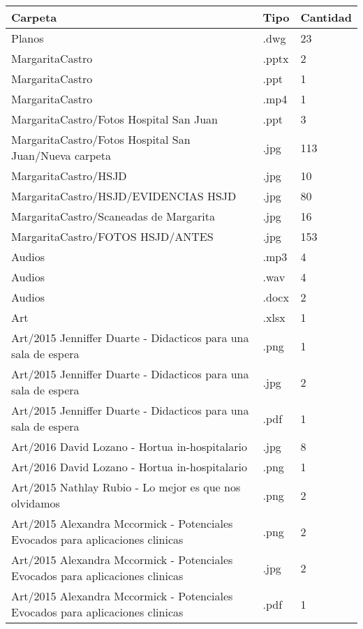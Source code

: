 \begin{table}[h!]
    \centering
    \footnotesize
    \begin{tabular}{|l|l|l|}
    \hline
    Carpeta & Tipo & Cantidad \\
    \hline
    Planos & .dwg & 23 \\
    \hline
    MargaritaCastro & .pptx & 2 \\
    \hline
    MargaritaCastro & .ppt & 1 \\
    \hline
    MargaritaCastro & .mp4 & 1 \\
    \hline
    MargaritaCastro/Fotos Hospital San Juan & .ppt & 3 \\
    \hline
    MargaritaCastro/Fotos Hospital San Juan/Nueva carpeta & .jpg & 113 \\
    \hline
    MargaritaCastro/HSJD & .jpg & 10 \\
    \hline
    MargaritaCastro/HSJD/EVIDENCIAS HSJD & .jpg & 80 \\
    \hline
    MargaritaCastro/Scaneadas de Margarita & .jpg & 16 \\
    \hline
    MargaritaCastro/FOTOS HSJD/ANTES & .jpg & 153 \\
    \hline
    Audios & .mp3 & 4 \\
    \hline
    Audios & .wav & 4 \\
    \hline
    Audios & .docx & 2 \\
    \hline
    Art & .xlsx & 1 \\
    \hline
    Art/2015 Jenniffer Duarte - Didacticos para una sala de espera & .png & 1 \\
    \hline
    Art/2015 Jenniffer Duarte - Didacticos para una sala de espera & .jpg & 2 \\
    \hline
    Art/2015 Jenniffer Duarte - Didacticos para una sala de espera & .pdf & 1 \\
    \hline
    Art/2016 David Lozano - Hortua in-hospitalario & .jpg & 8 \\
    \hline
    Art/2016 David Lozano - Hortua in-hospitalario & .png & 1 \\
    \hline
    Art/2015 Nathlay Rubio - Lo mejor es que nos olvidamos & .png & 2 \\
    \hline
    Art/2015 Alexandra Mccormick - Potenciales Evocados para aplicaciones clinicas & .png & 2 \\
    \hline
    Art/2015 Alexandra Mccormick - Potenciales Evocados para aplicaciones clinicas & .jpg & 2 \\
    \hline
    Art/2015 Alexandra Mccormick - Potenciales Evocados para aplicaciones clinicas & .pdf & 1 \\

\end{tabular}
\end{table}
